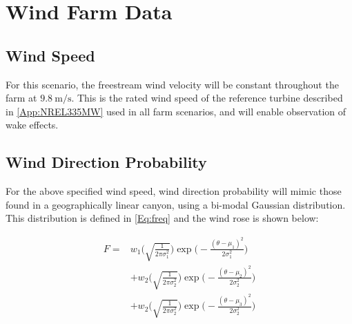 \documentclass[12pt]{article}
\begin{document}
\newpage
\section{Wind Farm Data}
    \subsection{Wind Speed}
        For this scenario, the freestream wind velocity will be constant throughout the farm at $9.8\ \textrm{m/s}$. This is the rated wind speed of the reference turbine described in \cref{App:NREL335MW} used in all farm scenarios, and will enable observation of wake effects.
    
    \subsection{Wind Direction Probability}
    
        For the above specified wind speed, wind direction probability will mimic those found in a geographically linear canyon, using a bi-modal Gaussian distribution. This distribution is defined in  \cref{Eq:freq} and the wind rose is shown below: %
        
        \begin{align}
            F = &w_1\Bigg(\sqrt{\frac{1}{2 \pi \sigma_1^2}}\Bigg)\exp\Bigg(-\frac{(\theta-\mu_1)^2}{2 \sigma_1^2}\Bigg) \nonumber \\
            &+ w_2\Bigg(\sqrt{\frac{1}{2 \pi \sigma_2^2}}\Bigg)\exp\Bigg(-\frac{(\theta-\mu_2)^2}{2 \sigma_2^2}\Bigg) \nonumber \\
            &+ w_2\Bigg(\sqrt{\frac{1}{2 \pi \sigma_2^2}}\Bigg)\exp\Bigg(-\frac{(\theta-\mu_3)^2}{2 \sigma_2^2}\Bigg)
        \label{Eq:freq}
        \end{align}
\end{document}

